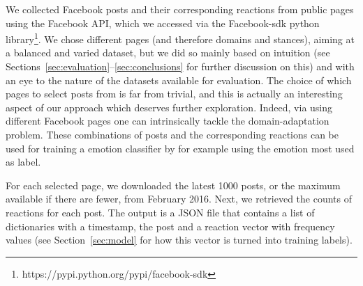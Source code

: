 \documentclass[11pt]{article}
\begin{document}
We collected Facebook posts and their corresponding reactions from public pages using the Facebook API, which we accessed via the Facebook-sdk python library\footnote{https://pypi.python.org/pypi/facebook-sdk}. We chose different pages (and therefore domains and stances), aiming at a balanced and varied dataset, but we did so mainly based on intuition (see Sections~\ref{sec:evaluation}--\ref{sec:conclusions} for further discussion on this) and with an eye to the nature of the datasets available for evaluation. The choice of which pages to select posts from is far from trivial, and this is actually an interesting aspect of our approach which deserves further exploration. Indeed, via using different Facebook pages one can intrinsically tackle the domain-adaptation problem. These combinations of posts and the corresponding reactions can be used for training a emotion classifier by for example using the emotion most used as label. 


%


For each selected page, we downloaded the latest 1000 posts, or the maximum available if there are fewer, from February 2016.
Next, we retrieved the counts of reactions for each post. The output is a JSON file that contains a list of dictionaries with a timestamp, the post and a reaction vector with frequency values (see Section~\ref{sec:model} for how this vector is turned into training labels).

\end{document}
